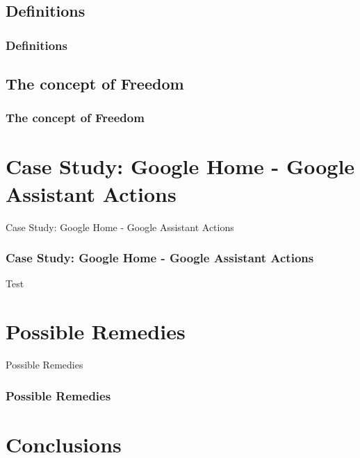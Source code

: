 \documentclass{beamer}
\begin{document}
\subsection{Definitions}
\begin{frame}
\frametitle{Definitions}
\end{frame}

\subsection{The concept of Freedom}
\begin{frame}
\frametitle{The concept of Freedom}
\end{frame}

\section{Case Study: Google Home - Google Assistant Actions}

\begin{frame}
\begin{center} 
	 Case Study: Google Home - Google Assistant Actions
\end{center}
\end{frame}

\begin{frame}
\frametitle{Case Study: Google Home - Google Assistant Actions}
Test
\end{frame}

\section{Possible Remedies}

\begin{frame}
\begin{center} 
	 Possible Remedies
\end{center}
\end{frame}

\begin{frame}
\frametitle{Possible Remedies}

\end{frame}

\section{Conclusions}
\end{document}
